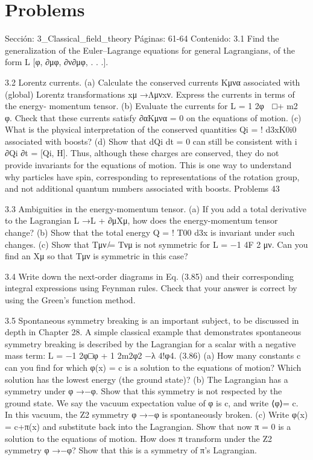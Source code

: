 \section*{Problems}
Sección: 3_Classical_field_theory
Páginas: 61-64
Contenido:
3.1 Find the generalization of the Euler–Lagrange equations for general Lagrangians,
of the form L [φ, ∂μφ, ∂ν∂μφ, . . .].

3.2 Lorentz currents.
(a) Calculate the conserved currents Kμνα associated with (global) Lorentz
transformations xμ →Λμνxν. Express the currents in terms of the energy-
momentum tensor.
(b) Evaluate the currents for L = 1
2φ

□+ m2
φ. Check that these currents satisfy
∂αKμνα = 0 on the equations of motion.
(c) What is the physical interpretation of the conserved quantities Qi =
!
d3xK0i0
associated with boosts?
(d) Show that dQi
dt = 0 can still be consistent with i ∂Qi
∂t = [Qi, H]. Thus, although
these charges are conserved, they do not provide invariants for the equations of
motion. This is one way to understand why particles have spin, corresponding
to representations of the rotation group, and not additional quantum numbers
associated with boosts.
Problems
43

3.3 Ambiguities in the energy-momentum tensor.
(a) If you add a total derivative to the Lagrangian L →L + ∂μXμ, how does the
energy-momentum tensor change?
(b) Show that the total energy Q =
!
T00 d3x is invariant under such changes.
(c) Show that Tμν ̸= Tνμ is not symmetric for L = −1
4F 2
μν. Can you ﬁnd an Xμ
so that Tμν is symmetric in this case?

3.4 Write down the next-order diagrams in Eq. (3.85) and their corresponding integral
expressions using Feynman rules. Check that your answer is correct by using the
Green’s function method.

3.5 Spontaneous symmetry breaking is an important subject, to be discussed in depth in
Chapter 28. A simple classical example that demonstrates spontaneous symmetry
breaking is described by the Lagrangian for a scalar with a negative mass term:
L = −1
2φ□φ + 1
2m2φ2 −λ
4!φ4.
(3.86)
(a) How many constants c can you ﬁnd for which φ(x) = c is a solution to the
equations of motion? Which solution has the lowest energy (the ground state)?
(b) The Lagrangian has a symmetry under φ →−φ. Show that this symmetry
is not respected by the ground state. We say the vacuum expectation value
of φ is c, and write ⟨φ⟩= c. In this vacuum, the Z2 symmetry φ →−φ is
spontaneously broken.
(c) Write φ(x) = c+π(x) and substitute back into the Lagrangian. Show that now
π = 0 is a solution to the equations of motion. How does π transform under
the Z2 symmetry φ →−φ? Show that this is a symmetry of π’s Lagrangian.

